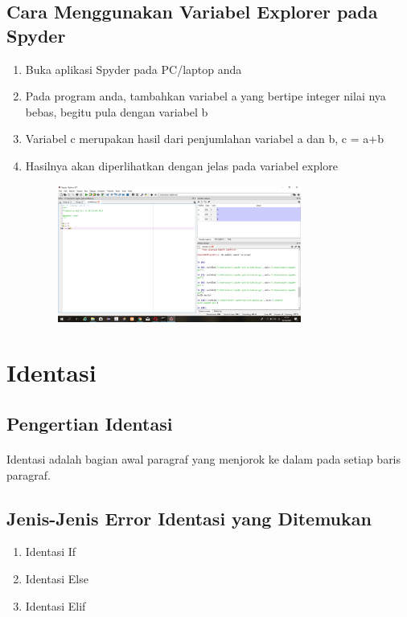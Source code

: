 \documentclass{article}
\begin{document}
\subsection{Cara Menggunakan Variabel Explorer pada Spyder}
\begin{enumerate}
    \item Buka aplikasi Spyder pada PC/laptop anda
    \item Pada program anda, tambahkan variabel a yang bertipe integer nilai nya bebas, begitu pula dengan variabel b
    \item Variabel c merupakan hasil dari penjumlahan variabel a dan b, c = a+b
    \item Hasilnya akan diperlihatkan dengan jelas pada variabel explore
        \begin{figure}[h]
            \centerline{\includegraphics[width=8cm]{image/variabelex.png}}
        \end{figure}
\end{enumerate}

\section{Identasi}
\subsection{Pengertian Identasi}
\paragraph{}
    Identasi adalah bagian awal paragraf yang menjorok ke dalam pada setiap baris paragraf.
\subsection{Jenis-Jenis Error Identasi yang Ditemukan}
\begin{enumerate}
    \item Identasi If
    \item Identasi Else
    \item Identasi Elif
\end{enumerate}
\end{document}
